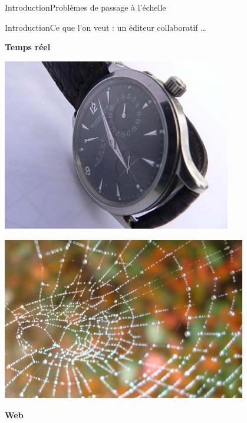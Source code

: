 \begin{frame}{Introduction}{Problèmes de passage à l'échelle}

\end{frame}


\begin{frame}{Introduction}{Ce que l'on veut : un éditeur collaboratif \ldots}
  
  \begin{minipage}{0.45\textwidth}
    \hfill \YES{\cmark} \textbf{Temps réel}
  \end{minipage}
  \begin{minipage}{0.45\textwidth}
    \includegraphics[width=0.75\textwidth]{img/watch.jpg}
  \end{minipage}
    
  \vspace{-0.75cm}

  \begin{minipage}{0.45\textwidth}
    \hfill  \includegraphics[width=0.8\textwidth]{img/toile.jpg}
  \end{minipage}  
  \begin{minipage}{0.45\textwidth}
    \textbf{Web} \YES{\cmark}
  \end{minipage}
  

\end{frame}
